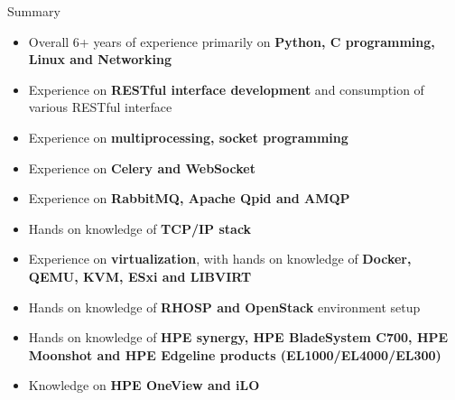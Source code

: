 \documentclass{resume} %
\begin{document}
  



\begin{rSection}{Summary}
\begin{itemize}
\item Overall 6+ years of experience primarily on \textbf{Python, C programming, Linux and Networking}
\item Experience on \textbf{RESTful interface development} and consumption of various RESTful interface
\item Experience on \textbf{multiprocessing, socket programming}
\item Experience on \textbf{Celery and WebSocket}
\item Experience on \textbf{RabbitMQ, Apache Qpid and AMQP}
\item Hands on knowledge of \textbf{TCP/IP stack}
\item Experience on \textbf{virtualization}, with hands on knowledge of \textbf{Docker, QEMU, KVM, ESxi and LIBVIRT}
\item Hands on knowledge of \textbf{RHOSP and OpenStack} environment setup
\item Hands on knowledge of \textbf{HPE synergy, HPE BladeSystem C700, HPE Moonshot and HPE Edgeline products (EL1000/EL4000/EL300)}
\item Knowledge on \textbf{HPE OneView and iLO}
\end{itemize}



\end{rSection}


\end{document}
